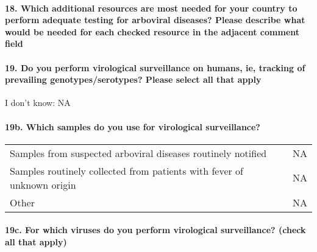 \documentclass[
]{article}
\begin{document}
\hypertarget{which-additional-resources-are-most-needed-for-your-country-to-perform-adequate-testing-for-arboviral-diseases-please-describe-what-would-be-needed-for-each-checked-resource-in-the-adjacent-comment-field}{%
\paragraph{18. Which additional resources are most needed for your
country to perform adequate testing for arboviral diseases? Please
describe what would be needed for each checked resource in the adjacent
comment
field}\label{which-additional-resources-are-most-needed-for-your-country-to-perform-adequate-testing-for-arboviral-diseases-please-describe-what-would-be-needed-for-each-checked-resource-in-the-adjacent-comment-field}}

\hypertarget{do-you-perform-virological-surveillance-on-humans-ie-tracking-of-prevailing-genotypesserotypes-please-select-all-that-apply}{%
\paragraph{19. Do you perform virological surveillance on humans, ie,
tracking of prevailing genotypes/serotypes? Please select all that
apply}\label{do-you-perform-virological-surveillance-on-humans-ie-tracking-of-prevailing-genotypesserotypes-please-select-all-that-apply}}

I don't know: NA

\hypertarget{b.-which-samples-do-you-use-for-virological-surveillance}{%
\paragraph{19b. Which samples do you use for virological
surveillance?}\label{b.-which-samples-do-you-use-for-virological-surveillance}}

\begin{longtable}[]{@{}ll@{}}
\toprule
\endhead
Samples from suspected arboviral diseases routinely notified & NA \\
Samples routinely collected from patients with fever of unknown origin &
NA \\
Other & NA \\
\bottomrule
\end{longtable}

\hypertarget{c.-for-which-viruses-do-you-perform-virological-surveillance-check-all-that-apply}{%
\paragraph{19c. For which viruses do you perform virological
surveillance? (check all that
apply)}\label{c.-for-which-viruses-do-you-perform-virological-surveillance-check-all-that-apply}}
\end{document}

